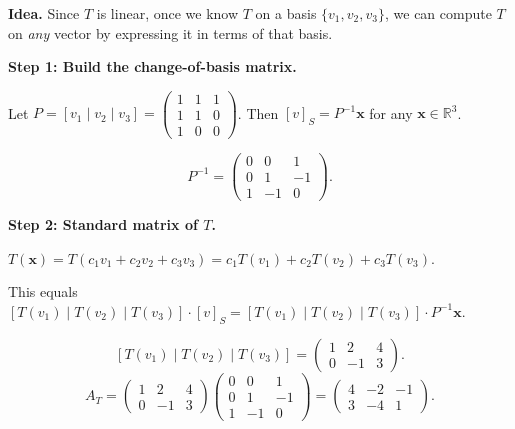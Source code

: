 \documentclass[12pt,a3paper]{article}
\begin{document}
\begin{tcolorbox}[enhanced,breakable,
  colback=cF!4,colframe=cF,boxrule=0.8pt,arc=5pt,
  title={\textbf{Answer --- $T:\mathbb{R}^3\to\mathbb{R}^2$ from Basis Values; Formula \& $T(5,-3,2)$}},
  fonttitle=\bfseries\color{white},colbacktitle=cF]

\textbf{Idea.} Since $T$ is linear, once we know $T$ on a basis $\{v_1,v_2,v_3\}$, we can compute $T$ on \emph{any} vector by expressing it in terms of that basis.

\medskip\textbf{Step 1: Build the change-of-basis matrix.}

Let $P=[v_1\mid v_2\mid v_3]=\begin{pmatrix}1&1&1\\1&1&0\\1&0&0\end{pmatrix}$.
Then $[v]_S = P^{-1}\mathbf{x}$ for any $\mathbf{x}\in\mathbb{R}^3$.

\[
P^{-1}=\begin{pmatrix}0&0&1\\0&1&-1\\1&-1&0\end{pmatrix}.
\]

\textbf{Step 2: Standard matrix of $T$.}

$T(\mathbf{x})=T(c_1v_1+c_2v_2+c_3v_3)=c_1T(v_1)+c_2T(v_2)+c_3T(v_3)$.

This equals $[T(v_1)\mid T(v_2)\mid T(v_3)]\cdot[v]_S=[T(v_1)\mid T(v_2)\mid T(v_3)]\cdot P^{-1}\mathbf{x}$.

\[
[T(v_1)\mid T(v_2)\mid T(v_3)]=\begin{pmatrix}1&2&4\\0&-1&3\end{pmatrix}.
\]
\[
A_T=\begin{pmatrix}1&2&4\\0&-1&3\end{pmatrix}\begin{pmatrix}0&0&1\\0&1&-1\\1&-1&0\end{pmatrix}=\begin{pmatrix}4&-2&-1\\3&-4&1\end{pmatrix}.
\]


\end{tcolorbox}
\end{document}
